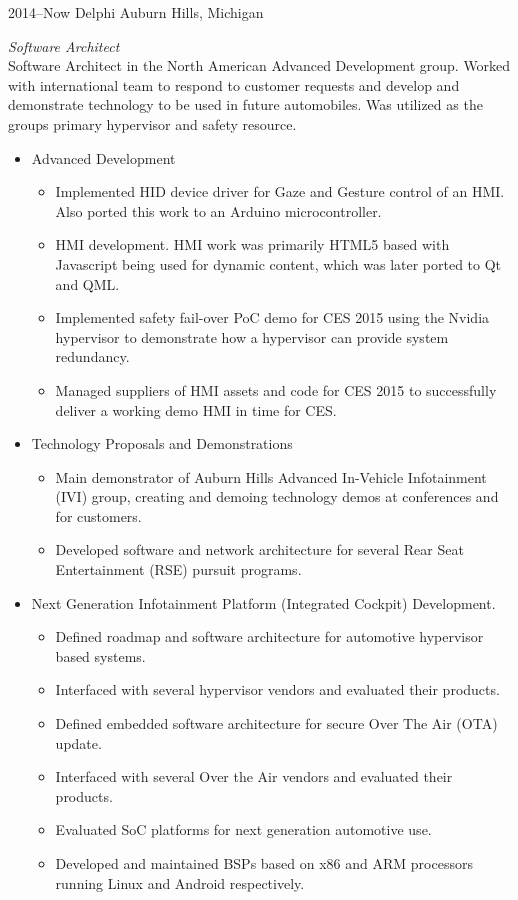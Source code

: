\documentclass[print]{template/friggeri-cv} %
\begin{document}
\begin{entrylist}

\entry
{2014--Now}
{Delphi}
{Auburn Hills, Michigan}
{\emph{Software Architect} \\
Software Architect in the North American Advanced Development group.  Worked with international team to respond to customer requests and develop and demonstrate technology to be used in future automobiles.  Was utilized as the groups primary hypervisor and safety resource.
\begin{itemize}
\item Advanced Development
\begin{itemize}
\item Implemented HID device driver for Gaze and Gesture control of an HMI.  Also ported this work to an Arduino microcontroller.
\item HMI development.  HMI work was primarily HTML5 based with Javascript being used for dynamic content, which was later ported to Qt and QML.
\item Implemented safety fail-over PoC demo for CES 2015 using the Nvidia hypervisor to demonstrate how a hypervisor can provide system redundancy.
\item Managed suppliers of HMI assets and code for CES 2015 to successfully deliver a working demo HMI in time for CES.
\end{itemize}
\item Technology Proposals and Demonstrations
\begin{itemize}
\item Main demonstrator of Auburn Hills Advanced In-Vehicle Infotainment (IVI) group, creating and demoing technology demos at conferences and for customers.
\item Developed software and network architecture for several Rear Seat Entertainment (RSE) pursuit programs.
\end{itemize}
\item Next Generation Infotainment Platform (Integrated Cockpit) Development.
\begin{itemize}
\item Defined roadmap and software architecture for automotive hypervisor based systems.
\item Interfaced with several hypervisor vendors and evaluated their products.
\item Defined embedded software architecture for secure Over The Air (OTA) update.
\item Interfaced with several Over the Air vendors and evaluated their products.
\item Evaluated SoC platforms for next generation automotive use.
\item Developed and maintained BSPs based on x86 and ARM processors running Linux and Android respectively.
\end{itemize}
\end{itemize}}

\end{entrylist}
\end{document}
